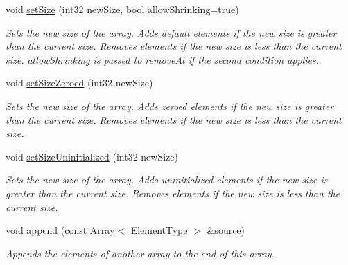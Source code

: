 \begin{DoxyCompactItemize}
\mbox{\label{class_arcana_1_1_array_a3c74bd3c106f7e9886dae9312dc718d9}} 
void \mbox{\hyperlink{class_arcana_1_1_array_a3c74bd3c106f7e9886dae9312dc718d9}{set\+Size}} (int32 new\+Size, bool allow\+Shrinking=true)
\begin{DoxyCompactList}\small\item\em Sets the new size of the array. Adds default elements if the new size is greater than the current size. Removes elements if the new size is less than the current size. \textquotesingle{}allow\+Shrinking\textquotesingle{} is passed to remove\+At if the second condition applies. \end{DoxyCompactList}\item 
\mbox{\label{class_arcana_1_1_array_afd840db9b03bf4a78ea85b25491db2b5}} 
void \mbox{\hyperlink{class_arcana_1_1_array_afd840db9b03bf4a78ea85b25491db2b5}{set\+Size\+Zeroed}} (int32 new\+Size)
\begin{DoxyCompactList}\small\item\em Sets the new size of the array. Adds zeroed elements if the new size is greater than the current size. Removes elements if the new size is less than the current size. \end{DoxyCompactList}\item 
\mbox{\label{class_arcana_1_1_array_a6637be0f19593819cbf47e7a4d869b3f}} 
void \mbox{\hyperlink{class_arcana_1_1_array_a6637be0f19593819cbf47e7a4d869b3f}{set\+Size\+Uninitialized}} (int32 new\+Size)
\begin{DoxyCompactList}\small\item\em Sets the new size of the array. Adds uninitialized elements if the new size is greater than the current size. Removes elements if the new size is less than the current size. \end{DoxyCompactList}\item 
\mbox{\label{class_arcana_1_1_array_a8fa733f0d3e13a2067d8bc6462cfc60a}} 
void \mbox{\hyperlink{class_arcana_1_1_array_a8fa733f0d3e13a2067d8bc6462cfc60a}{append}} (const \mbox{\hyperlink{class_arcana_1_1_array}{Array}}$<$ Element\+Type $>$ \&source)
\begin{DoxyCompactList}\small\item\em Appends the elements of another array to the end of this array. \end{DoxyCompactList}\item 

\end{DoxyCompactItemize}

